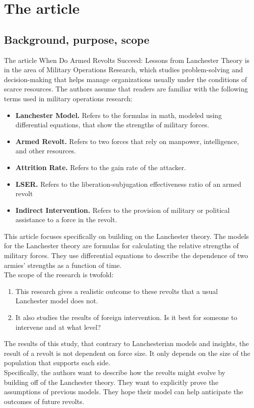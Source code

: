 \documentclass{article}
\begin{document}
\section{The article}
\subsection{Background, purpose, scope}
The article When Do Armed Revolts Succeed: Lessons from Lanchester Theory is in the area of Military Operations Research, which studies problem-solving and decision-making that helps manage organizations usually under the conditions of scarce resources. The authors assume that readers are familiar with the following terms used in military operations research:
\begin{itemize}
    \item \textbf{Lanchester Model.} Refers to the formulas in math, modeled using differential equations, that show the strengths of military forces.
    \item \textbf{Armed Revolt.} Refers to two forces that rely on manpower, intelligence, and other resources.
    \item \textbf{Attrition Rate.} Refers to the gain rate of the attacker.
    \item \textbf{LSER.} Refers to the liberation-subjugation effectiveness ratio of an armed revolt
    \item \textbf{Indirect Intervention.} Refers to the provision of military or political assistance to a force in the revolt.
\end{itemize}
This article focuses specifically on building on the Lanchester theory. The models for the Lanchester theory are formulas for calculating the relative strengths of military forces. They use differential equations to describe the dependence of two armies’ strengths as a function of time\cite{atkinson2012armed}.
\\The scope of the research is twofold:
\begin{enumerate}
    \item This research gives a realistic outcome to these revolts that a usual Lanchester model does not.
    \item It also studies the results of foreign intervention. Is it best for someone to intervene and at what level?
\end{enumerate}
The results of this study, that contrary to Lanchesterian models and insights, the result of a revolt is not dependent on force size. It only depends on the size of the population that supports each side.
\medskip
\\Specifically, the authors want to describe how the revolts might evolve by building off of the Lanchester theory. They want to explicitly prove the assumptions of previous models. They hope their model can help anticipate the outcomes of future revolts.
\end{document}
